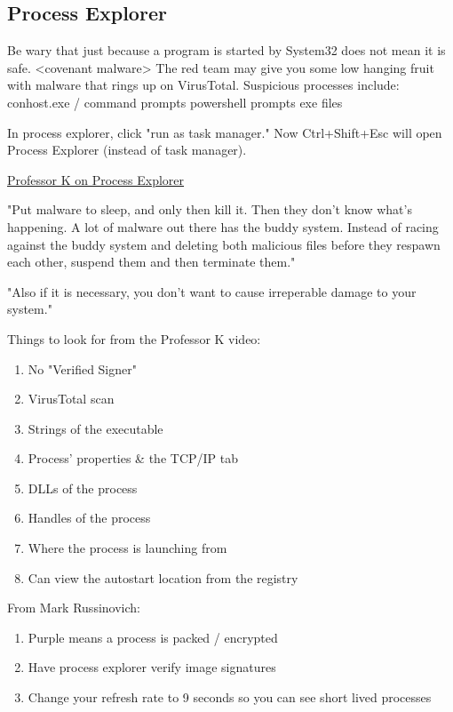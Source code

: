 \documentclass{article}
\begin{document}
\subsection{Process Explorer}
Be wary that just because a program is started by System32 does not mean it is safe. <covenant malware>
The red team may give you some low hanging fruit with malware that rings up on VirusTotal.
Suspicious processes include:
conhost.exe / command prompts
powershell prompts
exe files

In process explorer, click "run as task manager." Now Ctrl+Shift+Esc will open Process Explorer (instead of task manager).

\href{https://youtu.be/y2bNLCWHFNs}{Professor K on Process Explorer}

"Put malware to sleep, and only then kill it. 
Then they don't know what's happening.
A lot of malware out there has
the buddy system. Instead of racing against the buddy system
and deleting both malicious files before they respawn each other,
suspend them and then terminate them."

"Also if it is necessary, you don't want to cause irreperable damage to your system."

Things to look for from the Professor K video:
\begin{enumerate}
        \item No "Verified Signer"
        \item VirusTotal scan
        \item Strings of the executable
        \item Process' properties \& the TCP/IP tab
        \item DLLs of the process
        \item Handles of the process
        \item Where the process is launching from
        \item Can view the autostart location from the registry
\end{enumerate}

From Mark Russinovich:
\begin{enumerate}
        \item Purple means a process is packed / encrypted
        \item Have process explorer verify image signatures
        \item Change your refresh rate to 9 seconds so you can see short lived processes
\end{enumerate}
\end{document}
